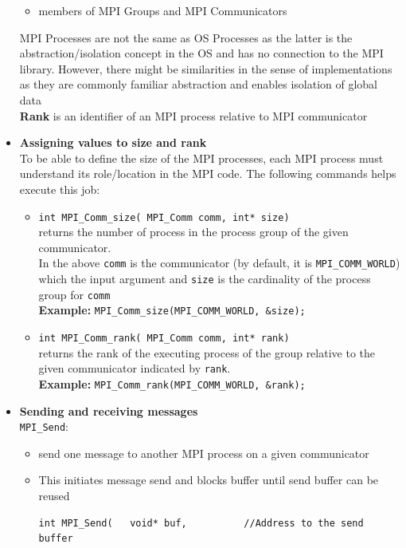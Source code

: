 \documentclass[12pt, a4paper]{report}
\begin{document}
\begin{itemize}
\begin{itemize}
        \item members of MPI Groups and MPI Communicators
    \end{itemize}
    MPI Processes are not the same as OS Processes as the latter is the abstraction/isolation concept in the OS and has no connection to the MPI library. However, there might be 
    similarities in the sense of implementations as they are commonly familiar abstraction and enables isolation of global data\\
    {\bfseries{Rank}} is an identifier of an MPI process relative to MPI communicator
    \item {\bfseries{Assigning values to size and rank}}\\
    To be able to define the size of the MPI processes, each MPI process must understand its role/location in the MPI code. The following commands helps execute this job:
    \begin{itemize}
        \item \verb$int MPI_Comm_size( MPI_Comm comm, int* size)$\\
              returns the number of process in the process group of the given communicator.\\
              In the above \verb$comm$ is the communicator (by default, it is \verb$MPI_COMM_WORLD$) which the input argument and \verb$size$ is the cardinality of the process group
              for \verb$comm$\\
              {\bfseries{Example:}} \qquad \verb$MPI_Comm_size(MPI_COMM_WORLD, &size);$
        \item \verb$int MPI_Comm_rank( MPI_Comm comm, int* rank)$\\
              returns the rank of the executing process of the group relative to the given communicator indicated by \verb$rank$.\\
              {\bfseries{Example:}} \qquad \verb$MPI_Comm_rank(MPI_COMM_WORLD, &rank);$
    \end{itemize}
    \item {\bfseries{Sending and receiving messages}}\\
    \verb$MPI_Send$:
    \begin{itemize}
        \item send one message to another MPI process on a given communicator
        \item This initiates message send and blocks buffer until send buffer can be reused
\begin{verbatim}
int MPI_Send(   void* buf,          //Address to the send buffer

\end{verbatim}
\end{itemize}
\end{itemize}
\end{document}
